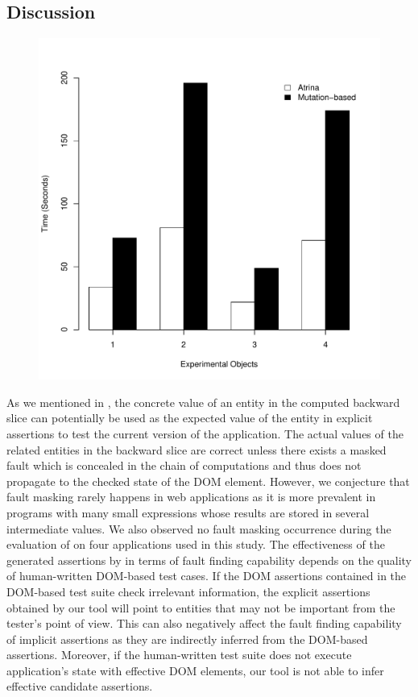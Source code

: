 \subsection{Discussion} \label{Sec:discussion}
\begin{figure}[!t]
  \centering
  \includegraphics[width=0.7\hsize]{r-scripts/performance}
  \vspace{-0.18in}   
  \vspace{-0.3in} 
  \label{Fig:performance}   
\end{figure}
 As we mentioned in , the concrete value of an entity in the computed backward slice can potentially be used as the expected value of the entity in explicit assertions to test the current version of the application.
The actual values of the related entities in the backward slice are correct unless there exists a masked fault which is concealed in the chain of computations and thus does not propagate to the checked state of the DOM element. However, we conjecture that fault masking rarely happens in \javascript web applications as it is more prevalent in programs with many small expressions whose results are stored in several intermediate values. We also observed no fault masking occurrence during the evaluation of \tool on four \javascript applications used in this study.
 The effectiveness of the generated assertions by \tool in terms of fault finding capability depends on the quality of human-written DOM-based test cases. If the DOM assertions contained in the DOM-based test suite check irrelevant information, the explicit assertions obtained by our tool will point to entities that may not be important from the tester's point of view. This can also negatively affect the fault finding capability of implicit assertions as they are indirectly inferred from the DOM-based assertions. Moreover, if the human-written test suite does not execute application's state with effective DOM elements, our tool is not able to infer effective candidate assertions.   